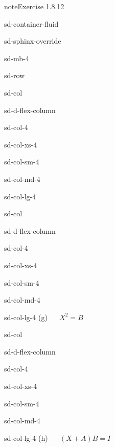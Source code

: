 \documentclass[letterpaper,10pt,english]{jupyterBook}
\begin{document}
\begin{sphinxadmonition}{note}{Exercise 1.8.12}
\begin{sphinxuseclass}{sd-container-fluid}
\begin{sphinxuseclass}{sd-sphinx-override}
\begin{sphinxuseclass}{sd-mb-4}
\begin{sphinxuseclass}{sd-row}
\begin{sphinxuseclass}{sd-col}
\begin{sphinxuseclass}{sd-d-flex-column}
\begin{sphinxuseclass}{sd-col-4}
\begin{sphinxuseclass}{sd-col-xs-4}
\begin{sphinxuseclass}{sd-col-sm-4}
\begin{sphinxuseclass}{sd-col-md-4}
\begin{sphinxuseclass}{sd-col-lg-4}
\end{sphinxuseclass}
\end{sphinxuseclass}
\end{sphinxuseclass}
\end{sphinxuseclass}
\end{sphinxuseclass}
\end{sphinxuseclass}
\end{sphinxuseclass}
\begin{sphinxuseclass}{sd-col}
\begin{sphinxuseclass}{sd-d-flex-column}
\begin{sphinxuseclass}{sd-col-4}
\begin{sphinxuseclass}{sd-col-xs-4}
\begin{sphinxuseclass}{sd-col-sm-4}
\begin{sphinxuseclass}{sd-col-md-4}
\begin{sphinxuseclass}{sd-col-lg-4}
\sphinxAtStartPar
(g)   \(X^2 = B\)

\end{sphinxuseclass}
\end{sphinxuseclass}
\end{sphinxuseclass}
\end{sphinxuseclass}
\end{sphinxuseclass}
\end{sphinxuseclass}
\end{sphinxuseclass}
\begin{sphinxuseclass}{sd-col}
\begin{sphinxuseclass}{sd-d-flex-column}
\begin{sphinxuseclass}{sd-col-4}
\begin{sphinxuseclass}{sd-col-xs-4}
\begin{sphinxuseclass}{sd-col-sm-4}
\begin{sphinxuseclass}{sd-col-md-4}
\begin{sphinxuseclass}{sd-col-lg-4}
\sphinxAtStartPar
(h)   \((X + A)B = I\)

\end{sphinxuseclass}
\end{sphinxuseclass}
\end{sphinxuseclass}
\end{sphinxuseclass}
\end{sphinxuseclass}
\end{sphinxuseclass}
\end{sphinxuseclass}
\end{sphinxuseclass}
\end{sphinxuseclass}
\end{sphinxuseclass}
\end{sphinxuseclass}\end{sphinxadmonition}
\end{document}

